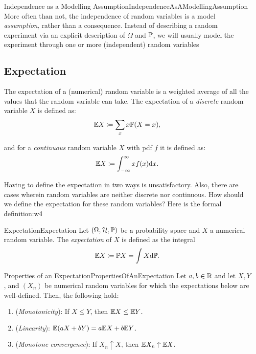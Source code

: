 \begin{xattention}{Independence as a Modelling Assumption}{IndependenceAsAModellingAssumption}
	More often than not, the independence of random variables is a model \textit{assumption}, rather than a consequence. Instead of describing a random experiment via an explicit description of \(\Omega\) and \(\mathbb{P}\), we will usually model the experiment through one or more (independent) random variables
\end{xattention}

\subsection{Expectation}
The expectation of a (numerical) random variable is a weighted average of all the values that the random variable can take. The expectation of a \textit{discrete} random variable \(X\) is defined as:
\begin{equation*}
	\mathbb{E} X \coloneqq \sum_x x \mathbb{P}(X = x),
\end{equation*}

and for a \textit{continuous} random variable \(X\) with pdf \(f\) it is defined as:
\begin{equation*}
	\mathbb{E} X \coloneqq \int_{-\infty}^{\infty} x f(x) \mathrm{d} x.
\end{equation*}

Having to define the expectation in two ways is unsatisfactory. Also, there are cases wherein random variables are neither discrete nor continuous. How should we define the expectation for these random variables? Here is the formal definition:w4


\begin{defn}{Expectation}{Expectation}
	Let $(\Omega, \mathcal{H}, \mathbb{P})$ be a probability space and $X$ a numerical random variable. The \textit{expectation} of $X$ is defined as the integral
	\begin{equation*}
		\mathbb{E} X \coloneqq \mathbb{P} X = \int X \mathrm{d} \mathbb{P}.
	\end{equation*}
\end{defn}

\begin{thm}{Properties of an Expectation}{PropertiesOfAnExpectation}
	Let $a, b \in \mathbb{R}$ and let $X, Y$, and $(X_n)$ be numerical random variables for which the expectations below are well-defined. Then, the following hold:
	\begin{enumerate}
		\item (\textit{Monotonicity}): If $X \le Y$, then $\mathbb{E} X \le \mathbb{E} Y$.
		\item (\textit{Linearity}): $\mathbb{E}(aX + bY) = a \mathbb{E} X + b \mathbb{E} Y$.
		\item (\textit{Monotone convergence}): If $X_n \uparrow X$, then $\mathbb{E} X_n \uparrow \mathbb{E} X$.
	\end{enumerate}
\end{thm}

